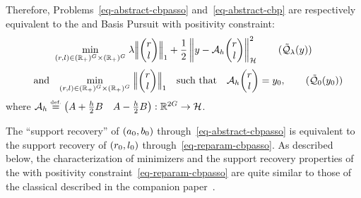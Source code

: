 Therefore, Problems~\eqref{eq-abstract-cbpasso} and~\eqref{eq-abstract-cbp} are respectively equivalent to the \lasso and Basis Pursuit with positivity constraint:
\begin{align}
  	\umin{(\parU,\parD)\in (\RR_+)^{\taillegrid}\times(\RR_+)^{\taillegrid}}  
    \la \normb{\vecrl}_1 + \frac{1}{2}\normH{y-\Cop\vecrl}^2  \tag{$\tilde{\Qq}_\la(y)$}\label{eq-reparam-cbpasso}
\end{align}
\begin{align}
\qandq
  \umin{(\parU,\parD)\in (\RR_+)^{\taillegrid}\times (\RR_+)^{\taillegrid}} 
  	\normb{\vecrl}_1 
	\quad\mbox{such that}\quad 
  \Cop\vecrl=y_0,  \tag{$\tilde{\Qq}_0(y_0)$}\label{eq-reparam-cbp}
\end{align}
where ${\mathcal{A}_h} \stackrel{\mbox{\upshape\tiny def.}}{=} \begin{pmatrix}{A}+\frac{h}{2} {B} & {A}-\frac{h}{2}{B}\end{pmatrix}:\mathbb{R}^{2G}\rightarrow \mathcal{H}$.

The ``support recovery'' of $(a_0,b_0)$ through~\eqref{eq-abstract-cbpasso} is equivalent to the support recovery of $(r_0,l_0)$ through~\eqref{eq-reparam-cbpasso}.
As described below, the characterization of minimizers and the support recovery properties of the \lasso with positivity constraint~\eqref{eq-reparam-cbpasso} are quite similar to those of the classical \lasso described in the companion paper~\cite[Section 2]{2016-duval-thinlasso}. 
 
